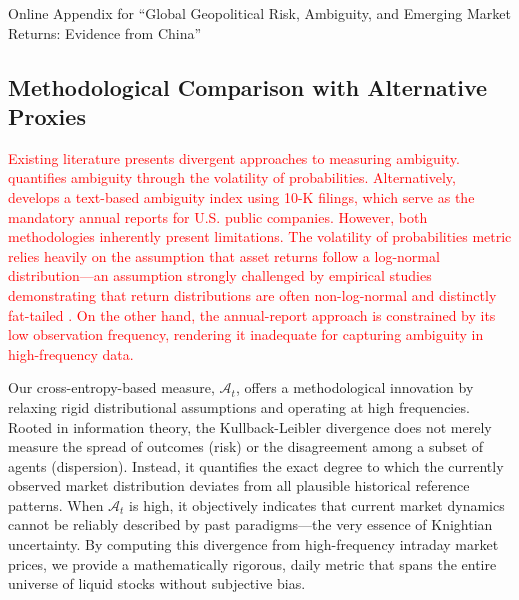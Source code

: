 \documentclass[preprint,12pt,authoryear]{elsarticle}
\begin{document}
\setcounter{equation}{0}
\setcounter{table}{0}
\renewcommand{\theequation}{\Alph{section}.\arabic{subsection}.\arabic{equation}}
\renewcommand{\thetable}{\Alph{section}.\arabic{subsection}.\arabic{table}}
\renewcommand{\thealgocf}{\Alph{section}.\arabic{subsection}}

\clearpage
\begin{center}
    \Large {Online Appendix for ``Global Geopolitical Risk, Ambiguity, and Emerging Market Returns: Evidence from China''}
\end{center}
\vspace{2em}

\subsection{Methodological Comparison with Alternative Proxies}
\label{app:alternative_proxies}

\textcolor{red}{Existing literature presents divergent approaches to measuring ambiguity. \citet{Brenner2018} quantifies ambiguity through the volatility of probabilities. Alternatively, \citet{fribergRiskAmbiguity10Ks2017} develops a text-based ambiguity index using 10-K filings, which serve as the mandatory annual reports for U.S. public companies. However, both methodologies inherently present limitations. The volatility of probabilities metric relies heavily on the assumption that asset returns follow a log-normal distribution—an assumption strongly challenged by empirical studies demonstrating that return distributions are often non-log-normal and distinctly fat-tailed \citep{dowellCommonStockReturn1978, longinChoiceDistributionAsset2005}. On the other hand, the annual-report approach is constrained by its low observation frequency, rendering it inadequate for capturing ambiguity in high-frequency data.}

Our cross-entropy-based measure, $\mathcal{A}_t$, offers a methodological innovation by relaxing rigid distributional assumptions and operating at high frequencies. Rooted in information theory, the Kullback-Leibler divergence does not merely measure the spread of outcomes (risk) or the disagreement among a subset of agents (dispersion). Instead, it quantifies the exact degree to which the currently observed market distribution deviates from all plausible historical reference patterns. When $\mathcal{A}_t$ is high, it objectively indicates that current market dynamics cannot be reliably described by past paradigms—the very essence of Knightian uncertainty. By computing this divergence from high-frequency intraday market prices, we provide a mathematically rigorous, daily metric that spans the entire universe of liquid stocks without subjective bias.
\end{document}
